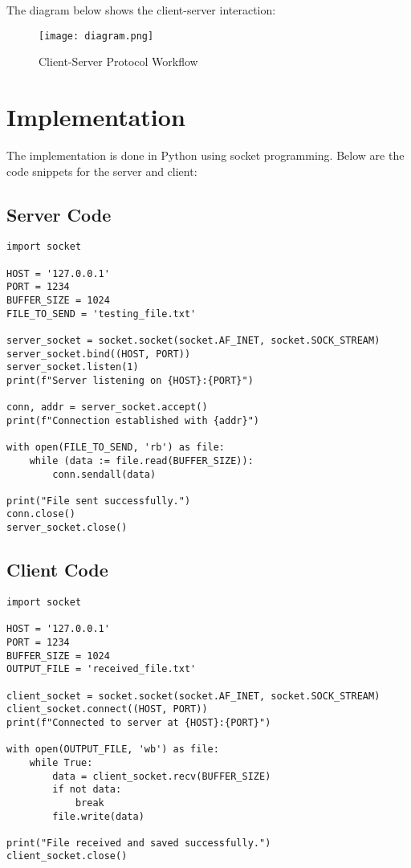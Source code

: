\documentclass[a4paper,12pt]{article}
\begin{document}
The diagram below shows the client-server interaction:

\begin{figure}[h!]
    \centering
    \texttt{[image: diagram.png]}
    \caption{Client-Server Protocol Workflow}
    \label{fig:protocol}
\end{figure}

\section*{Implementation}
The implementation is done in Python using socket programming. Below are the code snippets for the server and client:

\subsection*{Server Code}
\begin{lstlisting}
import socket

HOST = '127.0.0.1'
PORT = 1234
BUFFER_SIZE = 1024
FILE_TO_SEND = 'testing_file.txt'

server_socket = socket.socket(socket.AF_INET, socket.SOCK_STREAM)
server_socket.bind((HOST, PORT))
server_socket.listen(1)
print(f"Server listening on {HOST}:{PORT}")

conn, addr = server_socket.accept()
print(f"Connection established with {addr}")

with open(FILE_TO_SEND, 'rb') as file:
    while (data := file.read(BUFFER_SIZE)):
        conn.sendall(data)

print("File sent successfully.")
conn.close()
server_socket.close()
\end{lstlisting}

\subsection*{Client Code}
\begin{lstlisting}
import socket

HOST = '127.0.0.1'
PORT = 1234
BUFFER_SIZE = 1024
OUTPUT_FILE = 'received_file.txt'

client_socket = socket.socket(socket.AF_INET, socket.SOCK_STREAM)
client_socket.connect((HOST, PORT))
print(f"Connected to server at {HOST}:{PORT}")

with open(OUTPUT_FILE, 'wb') as file:
    while True:
        data = client_socket.recv(BUFFER_SIZE)
        if not data:
            break
        file.write(data)

print("File received and saved successfully.")
client_socket.close()
\end{lstlisting}
\end{document}
